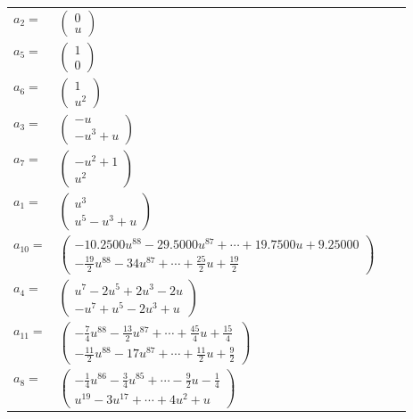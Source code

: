 \documentclass[1p]{elsarticle_modified}
\theoremstyle{definition}
\begin{document}
\begin{tabular}{m{7pt} m{180pt} m{7pt} m{180pt} }
\flushright $a_{2}=$&$\begin{pmatrix}0\\u\end{pmatrix}$ \\
\flushright $a_{5}=$&$\begin{pmatrix}1\\0\end{pmatrix}$ \\
\flushright $a_{6}=$&$\begin{pmatrix}1\\u^2\end{pmatrix}$ \\
\flushright $a_{3}=$&$\begin{pmatrix}- u\\- u^3+u\end{pmatrix}$ \\
\flushright $a_{7}=$&$\begin{pmatrix}- u^2+1\\u^2\end{pmatrix}$ \\
\flushright $a_{1}=$&$\begin{pmatrix}u^3\\u^5- u^3+u\end{pmatrix}$ \\
\flushright $a_{10}=$&$\begin{pmatrix}-10.2500 u^{88}-29.5000 u^{87}+\cdots+19.7500 u+9.25000\\-\frac{19}{2} u^{88}-34 u^{87}+\cdots+\frac{25}{2} u+\frac{19}{2}\end{pmatrix}$ \\
\flushright $a_{4}=$&$\begin{pmatrix}u^7-2 u^5+2 u^3-2 u\\- u^7+u^5-2 u^3+u\end{pmatrix}$ \\
\flushright $a_{11}=$&$\begin{pmatrix}-\frac{7}{4} u^{88}-\frac{13}{2} u^{87}+\cdots+\frac{45}{4} u+\frac{15}{4}\\-\frac{11}{2} u^{88}-17 u^{87}+\cdots+\frac{11}{2} u+\frac{9}{2}\end{pmatrix}$ \\
\flushright $a_{8}=$&$\begin{pmatrix}-\frac{1}{4} u^{86}-\frac{3}{4} u^{85}+\cdots-\frac{9}{2} u-\frac{1}{4}\\u^{19}-3 u^{17}+\cdots+4 u^2+u\end{pmatrix}$ \\

\end{tabular}
\end{document}

